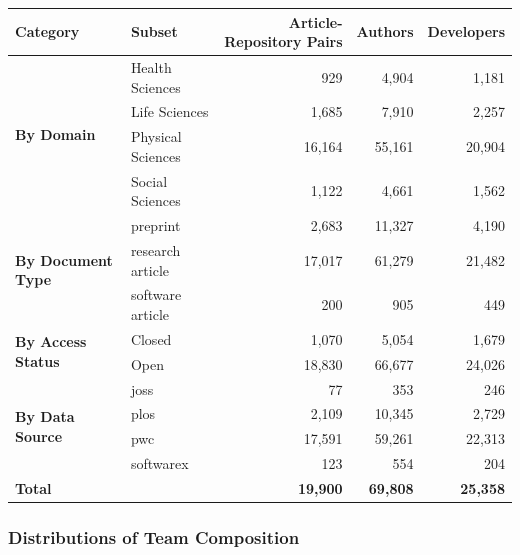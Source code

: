 \documentclass[
  letterpaper,
  DIV=11,
  numbers=noendperiod]{scrartcl}
\begin{document}
\begin{table}
{    
    \begin{tabular}{llrrr}
    \toprule
    \textbf{Category} & \textbf{Subset} & \textbf{Article-Repository Pairs} & \textbf{Authors} & \textbf{Developers} \\
    \midrule
        \multirow{4}{*}{\textbf{By Domain}} & \cellcolor{gray!10}Health Sciences & \cellcolor{gray!10}929 & \cellcolor{gray!10}4,904 & \cellcolor{gray!10}1,181 \\
    & Life Sciences & 1,685 & 7,910 & 2,257 \\
    & \cellcolor{gray!10}Physical Sciences & \cellcolor{gray!10}16,164 & \cellcolor{gray!10}55,161 & \cellcolor{gray!10}20,904 \\
    & Social Sciences & 1,122 & 4,661 & 1,562 \\\midrule
    \multirow{3}{*}{\textbf{By Document Type}} & \cellcolor{gray!10}preprint & \cellcolor{gray!10}2,683 & \cellcolor{gray!10}11,327 & \cellcolor{gray!10}4,190 \\
    & research article & 17,017 & 61,279 & 21,482 \\
    & \cellcolor{gray!10}software article & \cellcolor{gray!10}200 & \cellcolor{gray!10}905 & \cellcolor{gray!10}449 \\\midrule
    \multirow{2}{*}{\textbf{By Access Status}} & \cellcolor{gray!10}Closed & \cellcolor{gray!10}1,070 & \cellcolor{gray!10}5,054 & \cellcolor{gray!10}1,679 \\
    & Open & 18,830 & 66,677 & 24,026 \\\midrule
    \multirow{4}{*}{\textbf{By Data Source}} & \cellcolor{gray!10}joss & \cellcolor{gray!10}77 & \cellcolor{gray!10}353 & \cellcolor{gray!10}246 \\
    & plos & 2,109 & 10,345 & 2,729 \\
    & \cellcolor{gray!10}pwc & \cellcolor{gray!10}17,591 & \cellcolor{gray!10}59,261 & \cellcolor{gray!10}22,313 \\
    & softwarex & 123 & 554 & 204 \\\midrule
    \textbf{Total} & & \textbf{19,900} & \textbf{69,808} & \textbf{25,358} \\
    \bottomrule
    \end{tabular}
    

}

\end{table}%

\subsubsection{Distributions of Team
Composition}\label{distributions-of-team-composition}
\end{document}
